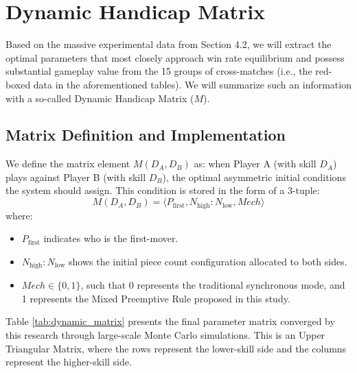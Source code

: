\section{Dynamic Handicap Matrix}
\label{sec:dynamic_handicap_matrix}

Based on the massive experimental data from Section 4.2, we will extract the optimal parameters that most closely approach win rate equilibrium and possess substantial gameplay value from the 15 groups of cross-matches (i.e., the red-boxed data in the aforementioned tables). We will summarize such an information with a so-called
Dynamic Handicap Matrix ($M$).

\subsection{Matrix Definition and Implementation}

We define the matrix element $M(D_A, D_B)$ as: when Player A (with skill $D_A$) plays against Player B (with skill $D_B$), the optimal asymmetric initial conditions the system should assign. This condition is stored in the form of a 3-tuple:
$$ M(D_A, D_B) = \langle P_{\text{first}}, N_{\text{high}} : N_{\text{low}}, Mech \rangle $$
where:
\begin{itemize}
    \item $P_{\text{first}}$ indicates who is the first-mover.
    \item $N_{\text{high}} : N_{\text{low}}$ shows the initial piece count configuration allocated to both sides.
    \item $Mech \in \{0, 1\}$, such that 0 represents the traditional synchronous mode, and 1 represents the Mixed Preemptive Rule proposed in this study.
\end{itemize}

Table \ref{tab:dynamic_matrix} presents the final parameter matrix converged by this research through large-scale Monte Carlo simulations. This is an Upper Triangular Matrix, where the rows represent the lower-skill side and the columns represent the higher-skill side.

